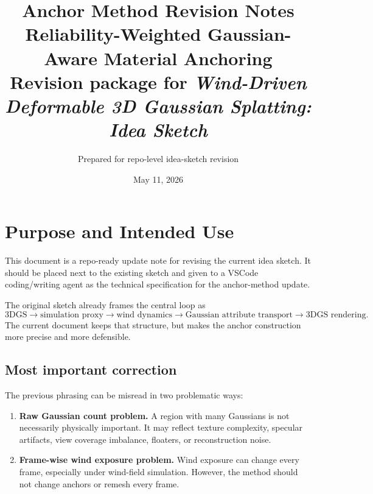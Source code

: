 \documentclass[11pt,a4paper]{article}
\title{\textbf{Anchor Method Revision Notes}\\
\large Reliability-Weighted Gaussian-Aware Material Anchoring\\
\normalsize Revision package for \textit{Wind-Driven Deformable 3D Gaussian Splatting: Idea Sketch}}
\author{Prepared for repo-level idea-sketch revision}
\date{May 11, 2026}
\begin{document}
\maketitle

\begin{center}
\end{center}

\section{Purpose and Intended Use}

This document is a repo-ready update note for revising the current idea sketch. It should be placed next to the existing sketch and given to a VSCode coding/writing agent as the technical specification for the anchor-method update.

The original sketch already frames the central loop as
\[
\text{3DGS} \rightarrow \text{simulation proxy} \rightarrow \text{wind dynamics} \rightarrow \text{Gaussian attribute transport} \rightarrow \text{3DGS rendering}.
\]
The current document keeps that structure, but makes the anchor construction more precise and more defensible.

\subsection{Most important correction}

The previous phrasing can be misread in two problematic ways:

\begin{enumerate}[leftmargin=2em]
\item \textbf{Raw Gaussian count problem.} A region with many Gaussians is not necessarily physically important. It may reflect texture complexity, specular artifacts, view coverage imbalance, floaters, or reconstruction noise.
\item \textbf{Frame-wise wind exposure problem.} Wind exposure can change every frame, especially under wind-field simulation. However, the method should not change anchors or remesh every frame.
\end{enumerate}
\end{document}
